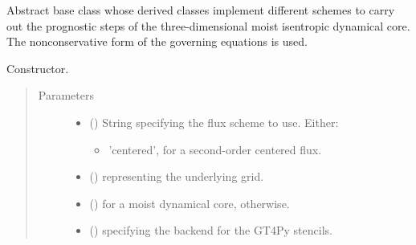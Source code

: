 \documentclass[letterpaper,10pt,english]{sphinxmanual}
\begin{document}
\begin{fulllineitems}
\label{\detokenize{api:tasmania.dycore.prognostic_isentropic_nonconservative.PrognosticIsentropicNonconservative}}
Abstract base class whose derived classes implement different schemes to carry out the
prognostic steps of the three-dimensional moist isentropic dynamical core.
The nonconservative form of the governing equations is used.

\begin{fulllineitems}
\label{\detokenize{api:tasmania.dycore.prognostic_isentropic_nonconservative.PrognosticIsentropicNonconservative.__init__}}
Constructor.
\begin{quote}\begin{description}
\item[{Parameters}] \leavevmode\begin{itemize}
\item {} 
 () \textendash{} 
String specifying the flux scheme to use. Either:
\begin{itemize}
\item {} 
’centered’, for a second-order centered flux.

\end{itemize}


\item {} 
 () \textendash{} {\hyperref[\detokenize{api:tasmania.grids.grid_xyz.GridXYZ}]{}} representing the underlying grid.

\item {} 
 () \textendash{}  for a moist dynamical core,  otherwise.

\item {} 
 () \textendash{}  specifying the backend for the GT4Py stencils.


\end{itemize}
\end{description}
\end{quote}
\end{fulllineitems}
\end{fulllineitems}
\end{document}
